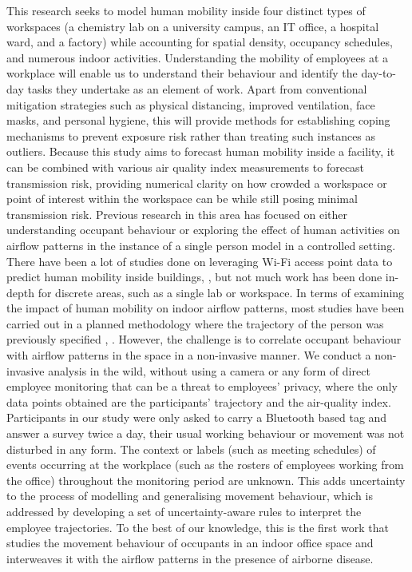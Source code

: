 \documentclass[acmtog]{acmart}
\begin{document}
This research seeks to model human mobility inside four distinct types of workspaces (a chemistry lab on a university campus, an IT office, a hospital ward, and a factory) while accounting for spatial density, occupancy schedules, and numerous indoor activities. Understanding the mobility of employees at a workplace will enable us to understand their behaviour and identify the day-to-day tasks they undertake as an element of work. Apart from conventional mitigation strategies such as physical distancing, improved ventilation, face masks, and personal hygiene, this will provide methods for establishing coping mechanisms to prevent exposure risk rather than treating such instances as outliers. Because this study aims to forecast human mobility inside a facility, it can be combined with various air quality index measurements to forecast transmission risk, providing numerical clarity on how crowded a workspace or point of interest within the workspace can be while still posing minimal transmission risk. Previous research in this area has focused on either understanding occupant behaviour or exploring the effect of human activities on airflow patterns in the instance of a single person model in a controlled setting. There have been a lot of studies done on leveraging Wi-Fi access point data to predict human mobility inside buildings, \cite{qian2016decimeter}, \cite{meneses2012large} but not much work has been done in-depth for discrete areas, such as a single lab or workspace. In terms of examining the impact of human mobility on indoor airflow patterns, most studies have been carried out in a planned methodology where the trajectory of the person was previously specified \cite{mahaki2021comparing}, \cite{wu2022transient}. However, the challenge is to correlate occupant behaviour with airflow patterns in the space in a non-invasive manner. We conduct a non-invasive analysis in the wild, without using a camera or any form of direct employee monitoring that can be a threat to employees' privacy, where the only data points obtained are the participants' trajectory and the air-quality index. Participants in our study were only asked to carry a Bluetooth based tag and answer a survey twice a day, their usual working behaviour or movement was not disturbed in any form. The context or labels (such as meeting schedules) of events occurring at the workplace (such as the rosters of employees working from the office) throughout the monitoring period are unknown. This adds uncertainty to the process of modelling and generalising movement behaviour, which is addressed by developing a set of uncertainty-aware rules to interpret the employee trajectories. To the best of our knowledge, this is the first work that studies the movement behaviour of occupants in an indoor office space and interweaves it with the airflow patterns in the presence of airborne disease. 
\end{document}
